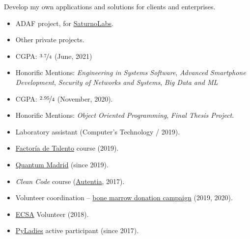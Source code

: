 \documentclass[10pt,a4paper,ragged2e]{altacv}
\begin{document}

Develop my own applications and solutions for clients and enterprises.
\begin{itemize}
  \item ADAF project, for \href{https://saturnolabs.com/}{SaturnoLabs}.
  \item Other private projects.
\end{itemize}

\begin{itemize}
  \item CGPA: $\nicefrac{3.7}{4}$ (June, 2021)
  \item Honorific Mentions: \textit{Engineering in Systems Software}, \textit{Advanced Smartphone Development}, \textit{Security of Networks and Systems}, \textit{Big Data and ML}
\end{itemize}

\divider

\begin{itemize}
    \item CGPA: $\nicefrac{2.95}{4}$ (November, 2020).
    \item Honorific Mentions: \textit{Object Oriented Programming}, \textit{Final Thesis Project}.
    \item Laboratory assistant (Computer's Technology / 2019).
\end{itemize}

\divider

\begin{itemize}
  \item \href{https://factoriatalento.es/}{Factoría de Talento} course (2019).
  \item \href{https://www.meetup.com/es-ES/quantummadrid/}{Quantum Madrid} (since 2019).
  \item \textit{Clean Code} course (\href{https://www.autentia.com/}{Autentia}, 2017).
  \item Volunteer coordination -- \href{https://www.upm.es/e-politecnica/?p=11246}{bone marrow donation campaign} (2019, 2020).
  \item \href{https://eventos.upm.es/12427/detail/european-conference-on-software-architectures-2018-ecsa18.html}{ECSA} Volunteer (2018).
  \item \href{http://madrid.pyladies.com/}{PyLadies} active participant (since 2017).
\end{itemize}
\end{document}
